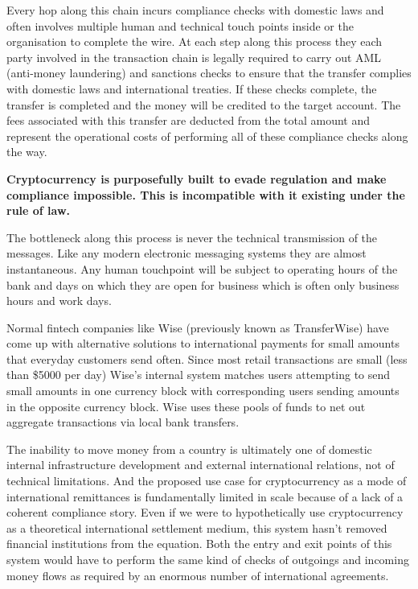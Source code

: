 Every hop along this chain incurs compliance checks with domestic laws
and often involves multiple human and technical touch points inside or
the organisation to complete the wire. At each step along this process
they each party involved in the transaction chain is legally required to
carry out AML (anti-money laundering) and sanctions checks to ensure
that the transfer complies with domestic laws and international
treaties. If these checks complete, the transfer is completed and the
money will be credited to the target account. The fees associated with
this transfer are deducted from the total amount and represent the
operational costs of performing all of these compliance checks along the
way.


\begin{infobox}
 \textbf{
   Cryptocurrency is purposefully built to evade regulation and make compliance
   impossible. This is incompatible with it existing under the rule of law.
  }
\end{infobox}

The bottleneck along this process is never the technical transmission of the
messages. Like any modern electronic messaging systems they are almost
instantaneous. Any human touchpoint will be subject to operating hours of the
bank and days on which they are open for business which is often only business
hours and work days.

Normal fintech companies like Wise (previously known as TransferWise) have come
up with alternative solutions to international payments for small amounts that
everyday customers send often. Since most retail transactions are small (less
than \$5000 per day) Wise's internal system matches users attempting to send
small amounts in one currency block with corresponding users sending amounts in
the opposite currency block.  Wise uses these pools of funds to net out
aggregate transactions via local bank transfers.

The inability to move money from a country is ultimately one of domestic internal
infrastructure development and external international relations, not of
technical limitations. And the proposed use case for cryptocurrency as a mode of
international remittances is fundamentally limited in scale because of a lack of
a coherent compliance story. Even if we were to hypothetically use
cryptocurrency as a theoretical international settlement medium, this system
hasn't removed financial institutions from the equation. Both the entry and exit
points of this system would have to perform the same kind of checks of outgoings
and incoming money flows as required by an enormous number of international
agreements.

